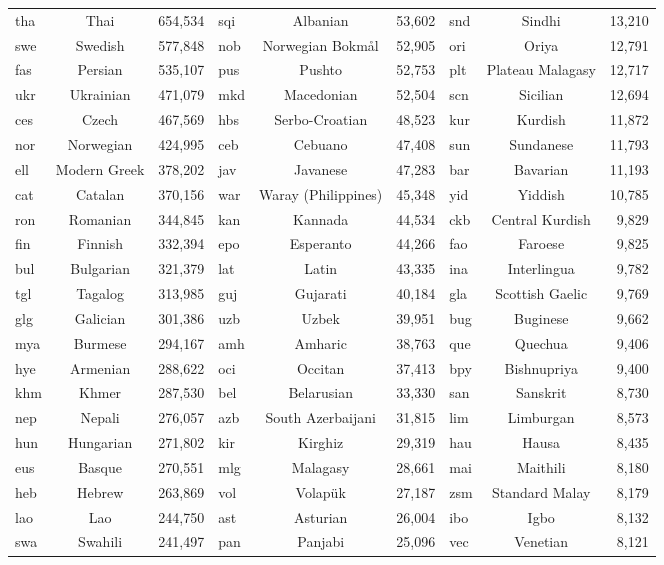 \begin{table}[th]
{\begin{tabular}{m{1cm}<{\centering}cr|m{1cm}<{\centering}cr|m{1cm}<{\centering}cr}
tha & Thai & 654,534 & sqi & Albanian & 53,602 & snd & Sindhi & 13,210 \\
swe & Swedish & 577,848 & nob & Norwegian Bokmål & 52,905 & ori & Oriya & 12,791 \\
fas & Persian & 535,107 & pus & Pushto & 52,753 & plt & Plateau Malagasy & 12,717 \\
ukr & Ukrainian & 471,079 & mkd & Macedonian & 52,504 & scn & Sicilian & 12,694 \\
ces & Czech & 467,569 & hbs & Serbo-Croatian & 48,523 & kur & Kurdish & 11,872 \\
nor & Norwegian & 424,995 & ceb & Cebuano & 47,408 & sun & Sundanese & 11,793 \\
ell & Modern Greek & 378,202 & jav & Javanese & 47,283 & bar & Bavarian & 11,193 \\
cat & Catalan & 370,156 & war & Waray (Philippines) & 45,348 & yid & Yiddish & 10,785 \\
ron & Romanian & 344,845 & kan & Kannada & 44,534 & ckb & Central Kurdish & 9,829 \\
fin & Finnish & 332,394 & epo & Esperanto & 44,266 & fao & Faroese & 9,825 \\
bul & Bulgarian & 321,379 & lat & Latin & 43,335 & ina & Interlingua & 9,782 \\
tgl & Tagalog & 313,985 & guj & Gujarati & 40,184 & gla & Scottish Gaelic & 9,769 \\
glg & Galician & 301,386 & uzb & Uzbek & 39,951 & bug & Buginese & 9,662 \\
mya & Burmese & 294,167 & amh & Amharic & 38,763 & que & Quechua & 9,406 \\
hye & Armenian & 288,622 & oci & Occitan & 37,413 & bpy & Bishnupriya & 9,400 \\
khm & Khmer & 287,530 & bel & Belarusian & 33,330 & san & Sanskrit & 8,730 \\
nep & Nepali & 276,057 & azb & South Azerbaijani & 31,815 & lim & Limburgan & 8,573 \\
hun & Hungarian & 271,802 & kir & Kirghiz & 29,319 & hau & Hausa & 8,435 \\
eus & Basque & 270,551 & mlg & Malagasy & 28,661 & mai & Maithili & 8,180 \\
heb & Hebrew & 263,869 & vol & Volapük & 27,187 & zsm & Standard Malay & 8,179 \\
lao & Lao & 244,750 & ast & Asturian & 26,004 & ibo & Igbo & 8,132 \\
swa & Swahili & 241,497 & pan & Panjabi & 25,096 & vec & Venetian & 8,121 \\

\end{tabular}}
\end{table}
